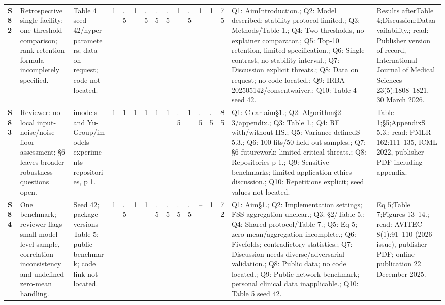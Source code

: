 \begin{longtable}{@{}P{1.0cm}P{4.6cm}P{3.6cm}P{0.3cm}P{0.3cm}P{0.3cm}P{0.3cm}P{0.3cm}P{0.3cm}P{0.3cm}P{0.3cm}P{0.3cm}P{0.36cm}P{0.75cm}P{3.0cm}P{3.9cm}@{}}
\textbf{S82} & Retrospective single facility; one threshold comparison; rank-retention formula incompletely specified. & Table 4 seed 42/\allowbreak{}hyperparameters; data on request; code not located. & 1 & .5 & 1 & .5 & .5 & .5 & 1 & .5 & 1 & 1 & 75 & Q1: AimIntroduction.; Q2: Model described; stability protocol limited.; Q3: Methods/\allowbreak{}Table 1.; Q4: Two thresholds, no explainer comparator.; Q5: Top-10 retention, limited specification.; Q6: Single contrast, no stability interval.; Q7: Discussion explicit threats.; Q8: Data on request; no code located.; Q9: IRBA 202505142/\allowbreak{}consentwaiver.; Q10: Table 4 seed 42. & Results afterTable 4;Discussion;Dataavailability.; read: Publisher version of record, International Journal of Medical Sciences 23(5):1808--1821, 30 March 2026. \\
\textbf{S83} & Reviewer: no local input-noise/\allowbreak{}noise-floor assessment; §6 leaves broader robustness questions open. & imodels and Yu-Group/\allowbreak{}imodels-experiments repositories, p 1. & 1 & 1 & 1 & 1 & 1 & 1 & .5 & 1 & .5 & .5 & 85 & Q1: Clear aim§1.; Q2: Algorithm§2--3/\allowbreak{}appendix.; Q3: Table 1.; Q4: RF with/\allowbreak{}without HS.; Q5: Variance definedS 5.3.; Q6: 100 fits/\allowbreak{}50 held-out samples.; Q7: §6 futurework; limited critical threats.; Q8: Repositories p 1.; Q9: Sensitive benchmarks; limited application ethics discussion.; Q10: Repetitions explicit; seed values not located. & Table 1;§5;AppendixS 5.3.; read: PMLR 162:111--135, ICML 2022, publisher PDF including appendix. \\
\textbf{S84} & One benchmark; reviewer flags small model-level sample, correlation inconsistency and undefined zero-mean handling. & Seed 42; package versions Table 5; public benchmark; code link not located. & 1 & .5 & 1 & 1 & .5 & .5 & .5 & .5 & -- & 1 & 72 & Q1: Aim§1.; Q2: Implementation settings; FSS aggregation unclear.; Q3: §2/\allowbreak{}Table 5.; Q4: Shared protocol/\allowbreak{}Table 7.; Q5: Eq 5; zero-mean/\allowbreak{}aggregation incomplete.; Q6: Fivefolds; contradictory statistics.; Q7: Discussion needs diverse/\allowbreak{}adversarial validation.; Q8: Public data; no code located.; Q9: Public network benchmark; personal clinical data inapplicable.; Q10: Table 5 seed 42. & Eq 5;Table 7;Figures 13--14.; read: AVITEC 8(1):91--110 (2026 issue), publisher PDF; online publication 22 December 2025. \\
\end{longtable}
